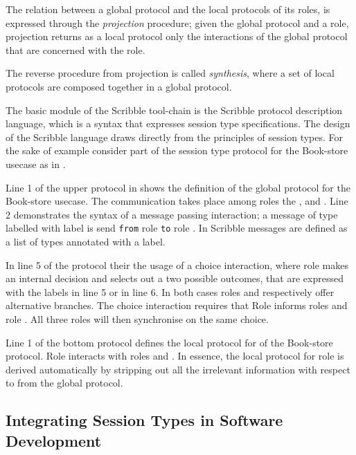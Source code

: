 The relation between a global protocol and the
local protocols of its roles, is expressed
through the {\em projection} procedure;
given the global protocol and a role, projection
returns as a local protocol only the
interactions of the global protocol that are concerned with
the role.

The reverse procedure from projection is called {\em synthesis},
where a set of local protocols are composed together in a global
protocol.

The basic module of the Scribble tool-chain is the
Scribble protocol description language,
which is a syntax that expresses session type specifications.
The design of the Scribble language draws directly from
the principles of session types. For the sake of example
consider part of the session type protocol for the Book-store
usecase as in . 



Line 1 of the upper protocol in  shows the
definition of the global protocol for the Book-store usecase.
The communication takes place
among roles the \BuyerOne, \BuyerTwo and \Seller. Line 2 demonstrates
the syntax of a message passing interaction; a message
of type  labelled with label  is send \lstinline|from|
role \BuyerOne \lstinline|to| role \Seller. In Scribble messages are
defined as a list of types annotated with a label.

In line 5 of the protocol their the usage of a choice interaction,
where role \BuyerTwo makes an internal decision and selects
out a two possible outcomes, that are
expressed with the labels  in line 5 or  in line 6.
In  both cases roles \BuyerOne and \Seller respectively offer
alternative branches. The choice interaction requires that
Role \BuyerTwo informs roles \BuyerOne and role \Seller. All
three roles will then synchronise on the same choice.


Line 1 of the bottom protocol defines the local protocol 
for \BuyerOne of the Book-store protocol. Role \BuyerOne
interacts with roles \BuyerTwo and \Seller. In essence,
the local protocol for role \BuyerOne is derived automatically
by stripping out all the irrelevant information with respect
to \BuyerOne from the global protocol.

\subsection{Integrating Session Types in Software Development}
\label{sec:sessions_integrate}

